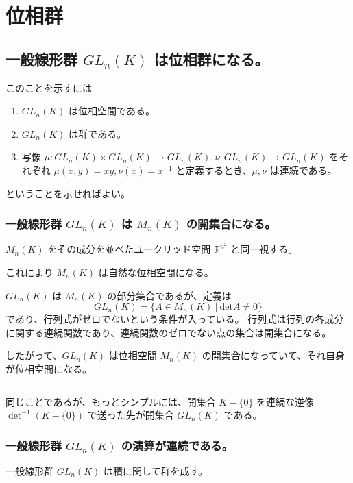\documentclass[uplatex,a4j,12pt,dvipdfmx]{jsarticle}
\begin{document}
\section{位相群}


\subsection{一般線形群 $GL_{n}(K)$ は位相群になる。}



このことを示すには

\begin{enumerate}
	\item $GL_{n}(K)$ は位相空間である。
	\item $GL_{n}(K)$ は群である。
	\item 写像 $\mu: GL_{n}(K) \times GL_{n}(K) \to GL_{n}(K), \nu: GL_{n}(K) \to GL_{n}(K)$ をそれぞれ $\mu(x,y)=xy, \nu(x) = x^{-1}$ と定義するとき、$\mu,\nu$ は連続である。
\end{enumerate}
ということを示せればよい。


\subsubsection{一般線形群 $GL_{n}(K)$ は $M_{n}(K)$ の開集合になる。}

$M_{n}(K)$ をその成分を並べたユークリッド空間 $\mathbb{R}^{n^{2}}$ と同一視する。

これにより $M_{n}(K)$ は自然な位相空間になる。

$GL_{n} (K)$ は $M_{n} (K)$ の部分集合であるが、定義は
$$
	GL_{n}(K) = \{ A \in M_{n}(K) \ | \ \text{det} A \neq 0 \}
$$
であり、行列式がゼロでないという条件が入っている。
行列式は行列の各成分に関する連続関数であり、連続関数のゼロでない点の集合は開集合になる。

したがって、$GL_{n}(K)$ は位相空間 $M_{n}(K)$ の開集合になっていて、それ自身が位相空間になる。


${}$


同じことであるが、もっとシンプルには、開集合 $K - \{0\}$ を連続な逆像 $\det^{-1} (K - \{0\})$ で送った先が開集合 $GL_{n}(K)$ である。

\subsubsection{一般線形群 $GL_{n}(K)$ の演算が連続である。}

一般線形群 $GL_{n}(K)$ は積に関して群を成す。
\end{document}
